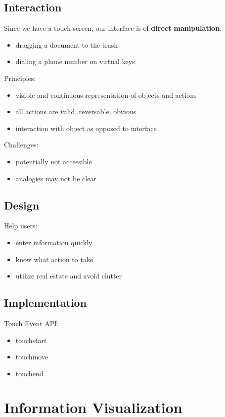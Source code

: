 \documentclass[]{article}
\theoremstyle{definition}
\begin{document}
	\subsection{Interaction}
	Since we have a touch screen, our interface is of \textbf{direct manipulation}:
	\begin{itemize}
		\item dragging a document to the trash
		\item dialing a phone number on virtual keys
	\end{itemize}
	Principles:
	\begin{itemize}
		\item visible and continuous representation of objects and actions
		\item all actions are valid, reversable, obvious
		\item interaction with object as opposed to interface
	\end{itemize}
	Challenges:
	\begin{itemize}
		\item potentially not accessible
		\item analogies may not be clear
	\end{itemize}

	\subsection{Design}
	Help users:
	\begin{itemize}
		\item enter information quickly
		\item know what action to take
		\item utilize real estate and avoid clutter 
	\end{itemize}

	\subsection{Implementation}
	Touch Event API:
	\begin{itemize}
		\item touchstart
		\item touchmove
		\item touchend
	\end{itemize}


	\section{Information Visualization}
	
\end{document}
